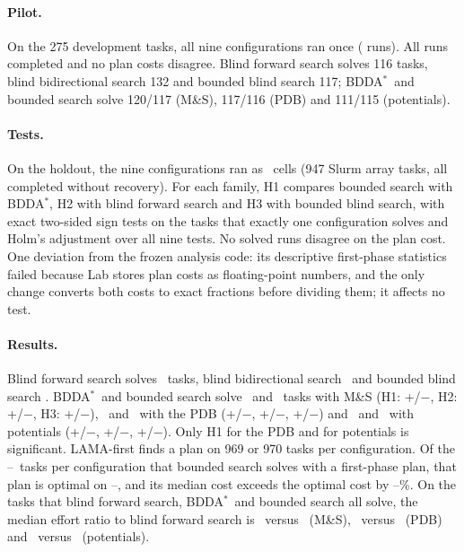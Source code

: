 \documentclass[letterpaper]{article}
\newcommand{\num}[1]{\numprint{#1}}
\newcommand{\bddastar}{BDDA\ensuremath{^{*}}}
\theoremstyle{plain}
\theoremstyle{definition}
\theoremstyle{remark}
\begin{document}
\paragraph{Pilot.}
On the 275 development tasks, all nine configurations ran once (\num{2475}
runs).  All runs completed and no plan costs disagree.  Blind forward search
solves 116 tasks, blind bidirectional search 132 and bounded blind search
117; \bddastar\ and bounded search solve 120/117 (M\&S), 117/116 (PDB) and
111/115 (potentials).

\paragraph{Tests.}
On the holdout, the nine configurations ran as \BdCells\ cells (947 Slurm
array tasks, all completed without recovery).  For each family, H1 compares
bounded search with \bddastar, H2 with blind forward search and H3 with
bounded blind search, with exact two-sided sign tests on the tasks that
exactly one configuration solves and Holm's adjustment over all nine tests.
No solved runs disagree on the plan cost.  One deviation from the frozen
analysis code: its descriptive first-phase statistics failed because Lab
stores plan costs as floating-point numbers, and the only change converts
both costs to exact fractions before dividing them; it affects no test.

\paragraph{Results.}
Blind forward search solves \BdSolvedBlindFw\ tasks, blind bidirectional
search \BdSolvedBlindBd\ and bounded blind search \BdSolvedBlindBounded.
\bddastar\ and bounded search solve \BdSolvedMsPlain\ and
\BdSolvedMsBounded\ tasks with M\&S (H1:
+\BdMsVsPlainGains/$-$\BdMsVsPlainLosses, H2:
+\BdMsVsBlindGains/$-$\BdMsVsBlindLosses, H3:
+\BdMsVsBlindBoundedGains/$-$\BdMsVsBlindBoundedLosses), \BdSolvedPdbPlain\
and \BdSolvedPdbBounded\ with the PDB
(+\BdPdbVsPlainGains/$-$\BdPdbVsPlainLosses,
+\BdPdbVsBlindGains/$-$\BdPdbVsBlindLosses,
+\BdPdbVsBlindBoundedGains/$-$\BdPdbVsBlindBoundedLosses) and
\BdSolvedPotPlain\ and \BdSolvedPotBounded\ with potentials
(+\BdPotVsPlainGains/$-$\BdPotVsPlainLosses,
+\BdPotVsBlindGains/$-$\BdPotVsBlindLosses,
+\BdPotVsBlindBoundedGains/$-$\BdPotVsBlindBoundedLosses).  Only H1 for the
PDB and for potentials is significant.  LAMA-first finds a plan on 969 or 970
tasks per configuration.  Of the \BdBoundSolvedMin--\BdBoundSolvedMax\ tasks
per configuration that bounded search solves with a first-phase plan, that
plan is optimal on \BdBoundOptimalMin--\BdBoundOptimalMax, and its median
cost exceeds the optimal cost by \BdBoundExcessMin--\BdBoundExcessMax\%.  On
the tasks that blind forward search, \bddastar\ and bounded search all solve,
the median effort ratio to blind forward search is \BdMsEffortPlain\ versus
\BdMsEffortBounded\ (M\&S), \BdPdbEffortPlain\ versus \BdPdbEffortBounded\
(PDB) and \BdPotEffortPlain\ versus \BdPotEffortBounded\ (potentials).
\end{document}
